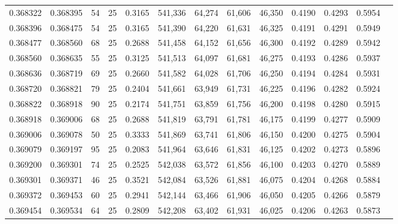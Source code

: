 \begin{tabular}{rrrrrrrrrrrrr}
0.368322 & 0.368395 &    54 &  25 &                                     0.3165 & 541,336 &  64,274 &  61,606 &  46,350 & 0.4190 & 0.4293 & 0.5954 \\
0.368396 & 0.368475 &    54 &  25 &                                     0.3165 & 541,390 &  64,220 &  61,631 &  46,325 & 0.4191 & 0.4291 & 0.5949 \\
0.368477 & 0.368560 &    68 &  25 &                                     0.2688 & 541,458 &  64,152 &  61,656 &  46,300 & 0.4192 & 0.4289 & 0.5942 \\
0.368560 & 0.368635 &    55 &  25 &                                     0.3125 & 541,513 &  64,097 &  61,681 &  46,275 & 0.4193 & 0.4286 & 0.5937 \\
0.368636 & 0.368719 &    69 &  25 &                                     0.2660 & 541,582 &  64,028 &  61,706 &  46,250 & 0.4194 & 0.4284 & 0.5931 \\
0.368720 & 0.368821 &    79 &  25 &                                     0.2404 & 541,661 &  63,949 &  61,731 &  46,225 & 0.4196 & 0.4282 & 0.5924 \\
0.368822 & 0.368918 &    90 &  25 &                                     0.2174 & 541,751 &  63,859 &  61,756 &  46,200 & 0.4198 & 0.4280 & 0.5915 \\
0.368918 & 0.369006 &    68 &  25 &                                     0.2688 & 541,819 &  63,791 &  61,781 &  46,175 & 0.4199 & 0.4277 & 0.5909 \\
0.369006 & 0.369078 &    50 &  25 &                                     0.3333 & 541,869 &  63,741 &  61,806 &  46,150 & 0.4200 & 0.4275 & 0.5904 \\
0.369079 & 0.369197 &    95 &  25 &                                     0.2083 & 541,964 &  63,646 &  61,831 &  46,125 & 0.4202 & 0.4273 & 0.5896 \\
0.369200 & 0.369301 &    74 &  25 &                                     0.2525 & 542,038 &  63,572 &  61,856 &  46,100 & 0.4203 & 0.4270 & 0.5889 \\
0.369301 & 0.369371 &    46 &  25 &                                     0.3521 & 542,084 &  63,526 &  61,881 &  46,075 & 0.4204 & 0.4268 & 0.5884 \\
0.369372 & 0.369453 &    60 &  25 &                                     0.2941 & 542,144 &  63,466 &  61,906 &  46,050 & 0.4205 & 0.4266 & 0.5879 \\
0.369454 & 0.369534 &    64 &  25 &                                     0.2809 & 542,208 &  63,402 &  61,931 &  46,025 & 0.4206 & 0.4263 & 0.5873 \\

\end{tabular}
